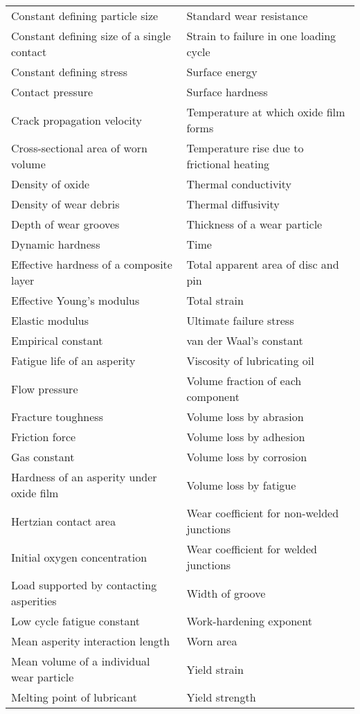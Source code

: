 \begin{scriptsize}
\begin{longtable}[b]{ll}
Constant defining particle size 	&	Standard wear resistance 		\\
Constant defining size of a single contact 	&	Strain to failure in one loading cycle 		\\
Constant defining stress 	&	Surface energy 		\\
Contact pressure	&	Surface hardness 		\\
Crack propagation velocity 	&	Temperature at which oxide film forms		\\
Cross-sectional area of worn volume 	&	Temperature rise due to frictional heating		\\
Density of oxide 	&	Thermal conductivity 		\\
Density of wear debris 	&	Thermal diffusivity 		\\
Depth of wear grooves 	&	Thickness of a wear particle		\\
Dynamic hardness 	&	Time 		\\
Effective hardness of a composite layer 	&	Total apparent area of disc and pin 		\\
Effective Young’s modulus 	&	Total strain 		\\
Elastic modulus 	&	Ultimate failure stress 		\\
Empirical constant 	&	van der Waal’s constant 		\\
Fatigue life of an asperity 	&	Viscosity of lubricating oil 		\\
Flow pressure 	&	Volume fraction of each component 		\\
Fracture toughness 	&	Volume loss by abrasion 		\\
Friction force 	&	Volume loss by adhesion 		\\
Gas constant 	&	Volume loss by corrosion 		\\
Hardness of an asperity under oxide film 	&	Volume loss by fatigue 		\\
Hertzian contact area 	&	Wear coefficient for non-welded junctions 		\\
Initial oxygen concentration 	&	Wear coefficient for welded junctions 		\\
Load supported by contacting asperities 	&	Width of groove 		\\
Low cycle fatigue constant 	&	Work-hardening exponent 		\\
Mean asperity interaction length 	&	Worn area 		\\
Mean volume of a individual wear particle 	&	Yield strain 		\\
Melting point of lubricant 	&	Yield strength		\\

\end{longtable}
\end{scriptsize}
\normalsize


